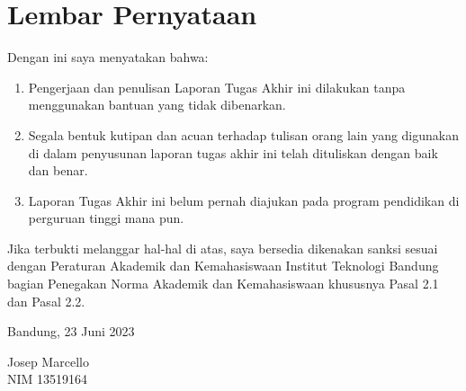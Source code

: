 \chapter*{Lembar Pernyataan}

Dengan ini saya menyatakan bahwa:

\begin{enumerate}

	\item Pengerjaan dan penulisan Laporan Tugas Akhir ini dilakukan tanpa
	      menggunakan bantuan yang tidak dibenarkan.
	\item Segala bentuk kutipan dan acuan terhadap tulisan orang lain yang
	      digunakan di dalam penyusunan laporan tugas akhir ini telah dituliskan
	      dengan baik dan benar.
	\item Laporan Tugas Akhir ini belum pernah diajukan pada program pendidikan
	      di perguruan tinggi mana pun.

\end{enumerate}

Jika terbukti melanggar hal-hal di atas, saya bersedia dikenakan sanksi sesuai
dengan Peraturan Akademik dan Kemahasiswaan Institut Teknologi Bandung bagian
Penegakan Norma Akademik dan Kemahasiswaan khususnya Pasal 2.1 dan Pasal 2.2.

\vspace{10mm}

Bandung, 23 Juni 2023

\vspace{30mm}

Josep Marcello \\
NIM 13519164
